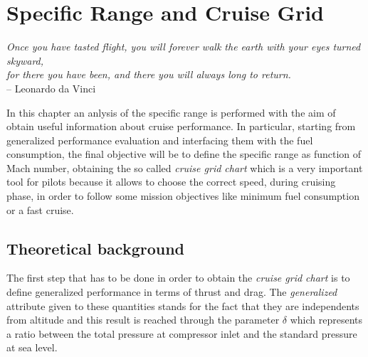 \chapter{Specific Range and Cruise Grid}

\begin{flushright}
	{\smaller
		\textit{Once you have tasted flight, you will forever walk the earth with your eyes turned skyward,\\ for there you have been, and there you will always long to return.}\\
		--  Leonardo da Vinci}
\end{flushright}

\noindent
In this chapter an anlysis of the specific range is performed with the aim of obtain useful information about cruise performance. 
%
In particular, starting from generalized performance evaluation and interfacing them with the fuel consumption, the final objective will be to define the specific range as function of Mach number, obtaining the so called \emph{cruise grid chart} which is a very important tool for pilots because it allows to choose the correct speed, during cruising phase, in order to follow some mission objectives like minimum fuel consumption or a fast cruise.
%
\section{Theoretical background}
The first step that has to be done in order to obtain the \emph{cruise grid chart} is to define generalized performance in terms of thrust and drag. The \emph{generalized} attribute given to these quantities stands for the fact that they are independents from altitude and this result is reached through the parameter $\delta$ which represents a ratio between the total pressure at compressor inlet and  the standard pressure at sea level. 

